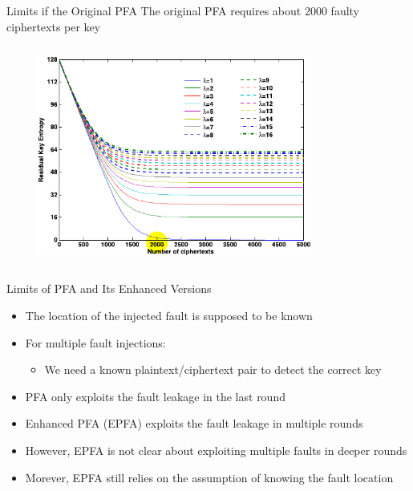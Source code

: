 \documentclass[table,aspectratio=169]{beamer}
\begin{document}
\begin{frame}{Limits if the Original PFA}
The original PFA requires about 2000 faulty ciphertexts per key \cite{tches_0010L0BHDQR18}
\begin{columns}[onlytextwidth]
\begin{figure}
\centering
\includegraphics[width=0.8\textwidth]{./figures/pfa_residual_keys.pdf}
\end{figure}
\end{columns}
\end{frame}

\begin{frame}{Limits of PFA and Its Enhanced Versions}
\begin{itemize}
\item<1-> The \textcolor{tug}{location of the injected} fault is supposed to be known
\item<2-> For multiple fault injections:
\begin{itemize}
  \item We need a known plaintext/ciphertext pair to detect the correct key
\end{itemize}
\item<3-> PFA only exploits the fault leakage in the last round
\item<4-> Enhanced PFA (EPFA) \cite{tcad_XuZYZHR21} exploits the fault leakage in multiple rounds
\item<5-> However, EPFA is not clear about exploiting multiple faults in deeper rounds
\item<6-> Morever, EPFA still relies on the assumption of knowing the \textcolor{tug}{fault location}
\end{itemize}
\end{frame}
\end{document}
